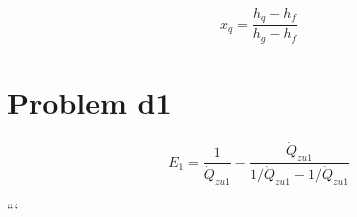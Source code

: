 \[
x_q = \frac{h_q - h_f}{h_g - h_f}
\]

\section*{Problem d1}
\[
E_1 = \frac{1}{\dot{Q}_{zu1}} - \frac{\dot{Q}_{zu1}}{1/\dot{Q}_{zu1} - 1/\dot{Q}_{zu1}}
\]

```